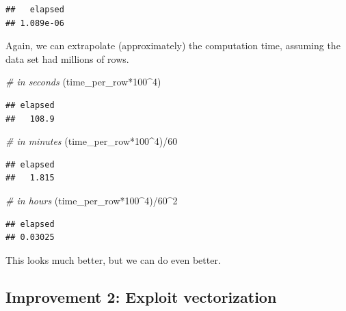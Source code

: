 \documentclass[
  12pt,
]{style/krantz}
\newenvironment{Shaded}{\begin{snugshade}}{\end{snugshade}}
\newcommand{\CommentTok}[1]{\textcolor[rgb]{0.56,0.35,0.01}{\textit{#1}}}
\newcommand{\DecValTok}[1]{\textcolor[rgb]{0.00,0.00,0.81}{#1}}
\newcommand{\NormalTok}[1]{#1}
\newcommand{\SpecialCharTok}[1]{\textcolor[rgb]{0.00,0.00,0.00}{#1}}
\begin{document}
\begin{verbatim}
##   elapsed 
## 1.089e-06
\end{verbatim}

Again, we can extrapolate (approximately) the computation time, assuming the data set had millions of rows.

\begin{Shaded}
\begin{Highlighting}[]
\CommentTok{\# in seconds}
\NormalTok{(time\_per\_row}\SpecialCharTok{*}\DecValTok{100}\SpecialCharTok{\^{}}\DecValTok{4}\NormalTok{) }
\end{Highlighting}
\end{Shaded}

\begin{verbatim}
## elapsed 
##   108.9
\end{verbatim}

\begin{Shaded}
\begin{Highlighting}[]
\CommentTok{\# in minutes}
\NormalTok{(time\_per\_row}\SpecialCharTok{*}\DecValTok{100}\SpecialCharTok{\^{}}\DecValTok{4}\NormalTok{)}\SpecialCharTok{/}\DecValTok{60} 
\end{Highlighting}
\end{Shaded}

\begin{verbatim}
## elapsed 
##   1.815
\end{verbatim}

\begin{Shaded}
\begin{Highlighting}[]
\CommentTok{\# in hours}
\NormalTok{(time\_per\_row}\SpecialCharTok{*}\DecValTok{100}\SpecialCharTok{\^{}}\DecValTok{4}\NormalTok{)}\SpecialCharTok{/}\DecValTok{60}\SpecialCharTok{\^{}}\DecValTok{2} 
\end{Highlighting}
\end{Shaded}

\begin{verbatim}
## elapsed 
## 0.03025
\end{verbatim}

This looks much better, but we can do even better.

\hypertarget{improvement-2-exploit-vectorization}{%
\subsection{Improvement 2: Exploit vectorization}\label{improvement-2-exploit-vectorization}}
\end{document}
